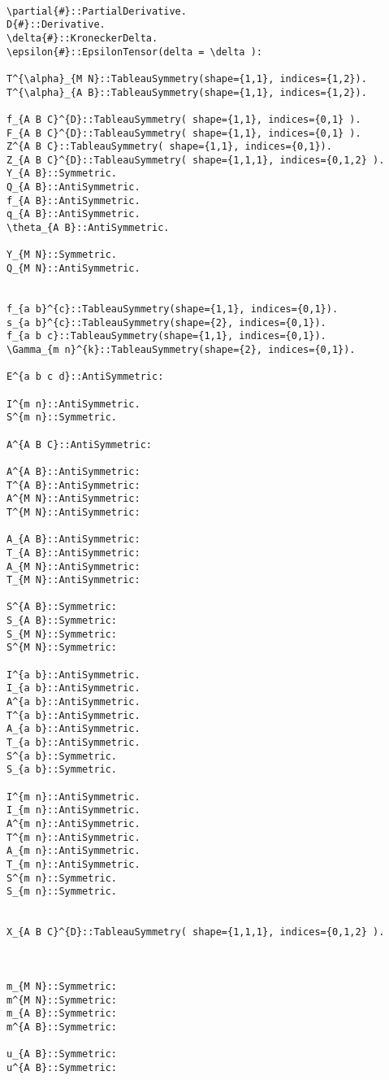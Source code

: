 \documentclass[11pt]{article}
\begin{document}
\\
{\color[named]{Blue}\begin{verbatim}
\partial{#}::PartialDerivative.
D{#}::Derivative.
\delta{#}::KroneckerDelta.
\epsilon{#}::EpsilonTensor(delta = \delta ):

T^{\alpha}_{M N}::TableauSymmetry(shape={1,1}, indices={1,2}).
T^{\alpha}_{A B}::TableauSymmetry(shape={1,1}, indices={1,2}).

f_{A B C}^{D}::TableauSymmetry( shape={1,1}, indices={0,1} ).  
F_{A B C}^{D}::TableauSymmetry( shape={1,1}, indices={0,1} ).  
Z^{A B C}::TableauSymmetry( shape={1,1}, indices={0,1}). 
Z_{A B C}^{D}::TableauSymmetry( shape={1,1,1}, indices={0,1,2} ).  
Y_{A B}::Symmetric.
Q_{A B}::AntiSymmetric.
f_{A B}::AntiSymmetric.
q_{A B}::AntiSymmetric.
\theta_{A B}::AntiSymmetric.

Y_{M N}::Symmetric.
Q_{M N}::AntiSymmetric.


f_{a b}^{c}::TableauSymmetry(shape={1,1}, indices={0,1}).
s_{a b}^{c}::TableauSymmetry(shape={2}, indices={0,1}).
f_{a b c}::TableauSymmetry(shape={1,1}, indices={0,1}).
\Gamma_{m n}^{k}::TableauSymmetry(shape={2}, indices={0,1}).

E^{a b c d}::AntiSymmetric:

I^{m n}::AntiSymmetric.
S^{m n}::Symmetric.

A^{A B C}::AntiSymmetric:

A^{A B}::AntiSymmetric:
T^{A B}::AntiSymmetric:
A^{M N}::AntiSymmetric:
T^{M N}::AntiSymmetric:

A_{A B}::AntiSymmetric:
T_{A B}::AntiSymmetric:
A_{M N}::AntiSymmetric:
T_{M N}::AntiSymmetric:

S^{A B}::Symmetric:
S_{A B}::Symmetric:
S_{M N}::Symmetric:
S^{M N}::Symmetric:

I^{a b}::AntiSymmetric.
I_{a b}::AntiSymmetric.
A^{a b}::AntiSymmetric.
T^{a b}::AntiSymmetric.
A_{a b}::AntiSymmetric.
T_{a b}::AntiSymmetric.
S^{a b}::Symmetric.
S_{a b}::Symmetric.

I^{m n}::AntiSymmetric.
I_{m n}::AntiSymmetric.
A^{m n}::AntiSymmetric.
T^{m n}::AntiSymmetric.
A_{m n}::AntiSymmetric.
T_{m n}::AntiSymmetric.
S^{m n}::Symmetric.
S_{m n}::Symmetric.


X_{A B C}^{D}::TableauSymmetry( shape={1,1,1}, indices={0,1,2} ).  



m_{M N}::Symmetric:
m^{M N}::Symmetric:
m_{A B}::Symmetric:
m^{A B}::Symmetric:

u_{A B}::Symmetric:
u^{A B}::Symmetric:


\end{verbatim}}
\end{document}
